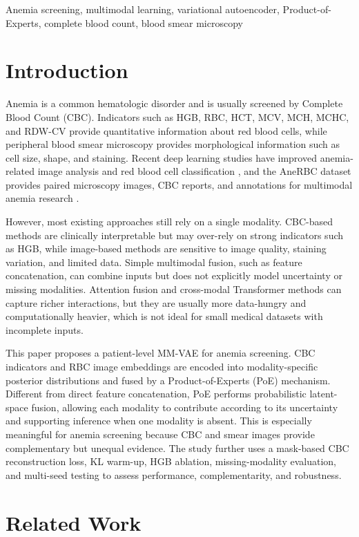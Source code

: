 \documentclass[conference,letterpaper]{IEEEtran}
\begin{document}
\begin{IEEEkeywords}
Anemia screening, multimodal learning, variational autoencoder, Product-of-Experts, complete blood count, blood smear microscopy
\end{IEEEkeywords}

\section{Introduction}

Anemia is a common hematologic disorder and is usually screened by Complete Blood Count (CBC). Indicators such as HGB, RBC, HCT, MCV, MCH, MCHC, and RDW-CV provide quantitative information about red blood cells, while peripheral blood smear microscopy provides morphological information such as cell size, shape, and staining. Recent deep learning studies have improved anemia-related image analysis and red blood cell classification \cite{ref1,ref2}, and the AneRBC dataset provides paired microscopy images, CBC reports, and annotations for multimodal anemia research \cite{ref3}.

However, most existing approaches still rely on a single modality. CBC-based methods are clinically interpretable but may over-rely on strong indicators such as HGB, while image-based methods are sensitive to image quality, staining variation, and limited data. Simple multimodal fusion, such as feature concatenation, can combine inputs but does not explicitly model uncertainty or missing modalities. Attention fusion and cross-modal Transformer methods can capture richer interactions, but they are usually more data-hungry and computationally heavier, which is not ideal for small medical datasets with incomplete inputs.

This paper proposes a patient-level MM-VAE for anemia screening. CBC indicators and RBC image embeddings are encoded into modality-specific posterior distributions and fused by a Product-of-Experts (PoE) mechanism. Different from direct feature concatenation, PoE performs probabilistic latent-space fusion, allowing each modality to contribute according to its uncertainty and supporting inference when one modality is absent. This is especially meaningful for anemia screening because CBC and smear images provide complementary but unequal evidence. The study further uses a mask-based CBC reconstruction loss, KL warm-up, HGB ablation, missing-modality evaluation, and multi-seed testing to assess performance, complementarity, and robustness.

\section{Related Work}
\end{document}
